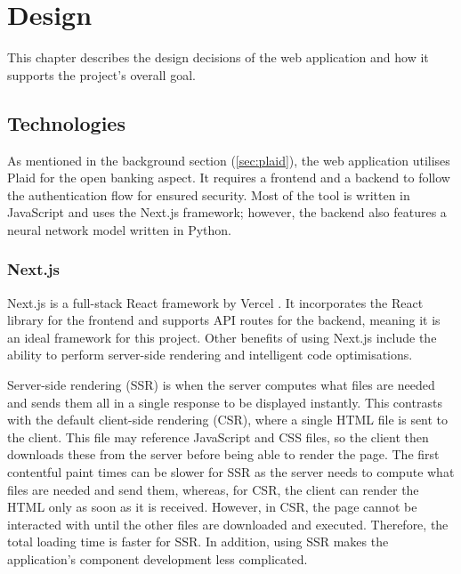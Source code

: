 \chapter{Design}
\label{ch:design}

This chapter describes the design decisions of the web application and how it supports the project's overall goal.

\section{Technologies}
\label{sec:technologies}
As mentioned in the background section (\ref{sec:plaid}), the web application utilises Plaid for the open banking aspect. It requires a frontend and a backend to follow the authentication flow for ensured security. Most of the tool is written in JavaScript and uses the Next.js framework; however, the backend also features a neural network model written in Python.

\subsection{Next.js}
Next.js is a full-stack React framework by Vercel \cite{Next.js}. It incorporates the React library for the frontend and supports API routes for the backend, meaning it is an ideal framework for this project. Other benefits of using Next.js include the ability to perform server-side rendering and intelligent code optimisations.

Server-side rendering (SSR) is when the server computes what files are needed and sends them all in a single response to be displayed instantly. This contrasts with the default client-side rendering (CSR), where a single HTML file is sent to the client. This file may reference JavaScript and CSS files, so the client then downloads these from the server before being able to render the page. The first contentful paint times can be slower for SSR as the server needs to compute what files are needed and send them, whereas, for CSR, the client can render the HTML only as soon as it is received. However, in CSR, the page cannot be interacted with until the other files are downloaded and executed. Therefore, the total loading time is faster for SSR. In addition, using SSR makes the application's component development less complicated.

